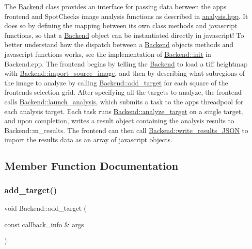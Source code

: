 The \hyperlink{class_backend}{Backend} class provides an interface for passing data between the app\textquotesingle{}s frontend and Spot\+Check\textquotesingle{}s image analysis functions as described in \hyperlink{analysis_8hpp}{analysis.\+hpp}. It does so by defining the mapping between it\textquotesingle{}s own class methods and javascript functions, so that a \hyperlink{class_backend}{Backend} object can be instantiated directly in javascript! To better understand how the dispatch between a \hyperlink{class_backend}{Backend} object\textquotesingle{}s methods and javascript functions works, see the implementation of \hyperlink{class_backend_a3bbb39435c576093a6b74520ae463398}{Backend\+::init} in Backend.\+cpp. The frontend begins by telling the \hyperlink{class_backend}{Backend} to load a tiff heightmap with \hyperlink{class_backend_aef5331c3d0f698924124af87c2d5877c}{Backend\+::import\+\_\+source\+\_\+image}, and then by describing what subregions of the image to analyze by calling \hyperlink{class_backend_ad8eb1ddd04ee12fe1e720b09b4fc4c4e}{Backend\+::add\+\_\+target} for each square of the frontend\textquotesingle{}s selection grid. After specifying all the targets to analyze, the frontend calls \hyperlink{class_backend_acab7db3b3b0f34798a48ba22a7e3e9ff}{Backend\+::launch\+\_\+analysis}, which submits a task to the app\textquotesingle{}s threadpool for each analysis target. Each task runs \hyperlink{class_backend_a149d05a4861bc09a73908f9817666586}{Backend\+::analyze\+\_\+target} on a single target, and upon completion, writes a result object containing the analysis results to Backend\+::m\+\_\+results. The frontend can then call \hyperlink{class_backend_a2bc5c7f6eb7a1c6ec5b5572410c4e81e}{Backend\+::write\+\_\+results\+\_\+\+J\+S\+ON} to import the results data as an array of javascript objects. 

\subsection{Member Function Documentation}
\mbox{\label{class_backend_ad8eb1ddd04ee12fe1e720b09b4fc4c4e}} 
\subsubsection{\texorpdfstring{add\+\_\+target()}{add\_target()}}
{\footnotesize\ttfamily void Backend\+::add\+\_\+target (\begin{DoxyParamCaption}\item[{const callback\+\_\+info \&}]{args }\end{DoxyParamCaption})\hspace{0.3cm}{\ttfamily [static]}}



